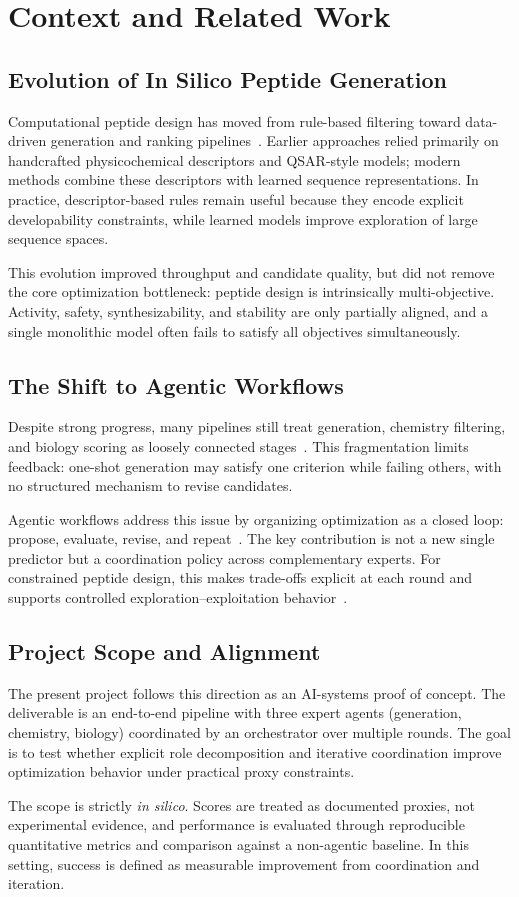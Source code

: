 \section{Context and Related Work}\label{sec:context}

\subsection{Evolution of In Silico Peptide Generation}
Computational peptide design has moved from rule-based filtering toward data-driven generation and ranking pipelines~\cite{wan2024machine}. Earlier approaches relied primarily on handcrafted physicochemical descriptors and QSAR-style models; modern methods combine these descriptors with learned sequence representations. In practice, descriptor-based rules remain useful because they encode explicit developability constraints, while learned models improve exploration of large sequence spaces.

This evolution improved throughput and candidate quality, but did not remove the core optimization bottleneck: peptide design is intrinsically multi-objective. Activity, safety, synthesizability, and stability are only partially aligned, and a single monolithic model often fails to satisfy all objectives simultaneously.

\subsection{The Shift to Agentic Workflows}
Despite strong progress, many pipelines still treat generation, chemistry filtering, and biology scoring as loosely connected stages~\cite{huang2025biomni}. This fragmentation limits feedback: one-shot generation may satisfy one criterion while failing others, with no structured mechanism to revise candidates.

Agentic workflows address this issue by organizing optimization as a closed loop: propose, evaluate, revise, and repeat~\cite{xi2023agentic}. The key contribution is not a new single predictor but a coordination policy across complementary experts. For constrained peptide design, this makes trade-offs explicit at each round and supports controlled exploration--exploitation behavior~\cite{wan2024machine}.

\subsection{Project Scope and Alignment}
The present project follows this direction as an AI-systems proof of concept. The deliverable is an end-to-end pipeline with three expert agents (generation, chemistry, biology) coordinated by an orchestrator over multiple rounds. The goal is to test whether explicit role decomposition and iterative coordination improve optimization behavior under practical proxy constraints.

The scope is strictly \textit{in silico}. Scores are treated as documented proxies, not experimental evidence, and performance is evaluated through reproducible quantitative metrics and comparison against a non-agentic baseline. In this setting, success is defined as measurable improvement from coordination and iteration.